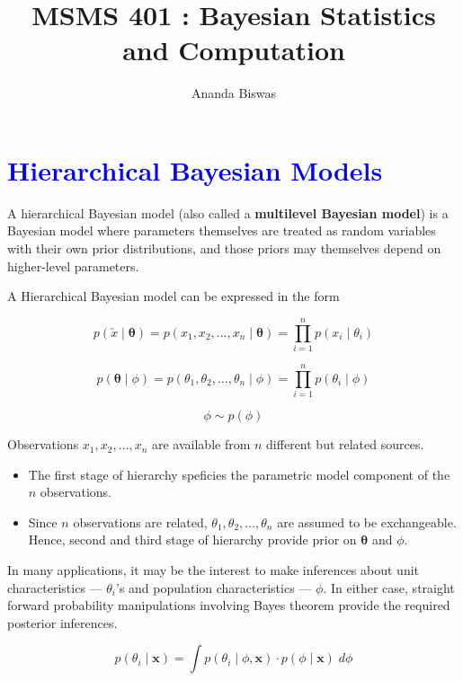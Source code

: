 \documentclass[12pt, a4paper]{article}
\title{MSMS 401 : Bayesian Statistics and Computation}
\author{{\fontsize{25}{20} \benyorithafont Ananda Biswas}}
\date{}
\theoremstyle{definition}
\begin{document}
\maketitle

\section{\textcolor{blue}{Hierarchical Bayesian Models}}

A hierarchical Bayesian model (also called a \textbf{multilevel Bayesian model}) is a Bayesian model where parameters themselves are treated as random variables with their own prior distributions, and those priors may themselves depend on higher-level parameters.

\vspace{0.5cm}

A Hierarchical Bayesian model can be expressed in the form

$$p\left( \utilde{x} \mid \boldsymbol{\theta} \right) = p\left( x_1, x_2, \ldots, x_n \mid \boldsymbol{\theta} \right) = \prod \limits_{i = 1}^{n} p\left(x_i \mid \theta_i \right)$$

$$p\left( \boldsymbol{\theta} \mid \phi \right) = p\left( \theta_1, \theta_2, \ldots, \theta_n \mid \phi \right) = \prod \limits_{i = 1}^{n} p\left( \theta_i \mid \phi \right)$$

$$\phi \sim p\left( \phi \right)$$

Observations $x_1, x_2, \ldots, x_n$ are available from $n$ different but related sources. \\[0.2em]

\begin{itemize}
\item The first stage of hierarchy speficies the parametric model component of the $n$ observations.

\item Since $n$ observations are related, $\theta_1, \theta_2, \ldots, \theta_n$ are assumed to be exchangeable. Hence, second and third stage of hierarchy provide prior on $\boldsymbol{\theta}$ and $\phi$.
\end{itemize}

In many applications, it may be the interest to make inferences about unit characteristics --- $\theta_i$'s and population characteristics --- $\phi$. In either case, straight forward probability manipulations involving Bayes theorem provide the required posterior inferences.

$$p\left( \theta_i \mid \boldsymbol{x} \right) = \displaystyle{\int p\left( \theta_i \mid \phi, \boldsymbol{x} \right) \cdot p\left( \phi \mid \boldsymbol{x} \right) \; d\phi}$$
\end{document}
